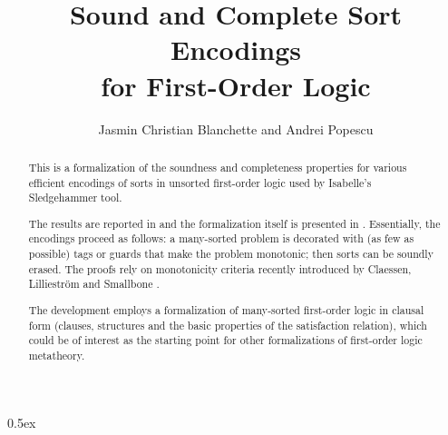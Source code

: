 \documentclass[11pt,a4paper]{article}
\begin{document}
\title{Sound and Complete Sort Encodings \\for First-Order Logic}
\author{Jasmin Christian Blanchette and Andrei Popescu}
\date{}
\maketitle

\begin{abstract}
This is a formalization of the soundness and completeness properties for
various efficient encodings of sorts in unsorted first-order logic
used by Isabelle's Sledgehammer tool.

The results are reported in
\cite[\S2,3]{blanchette-et-al-2013-types-conf} and the formalization itself
is presented in \cite[\S3--5]{froc}.
%
Essentially, the encodings proceed as follows: a many-sorted problem is
decorated with (as few as possible) tags or guards that make the problem monotonic;
then sorts can be soundly erased.
%
The proofs rely on monotonicity criteria recently introduced by
Claessen, Lilliestr{\"o}m and Smallbone \cite{claessen-et-al-2011}.


The development employs a formalization of many-sorted first-order logic in clausal
form (clauses, structures and the basic properties of the satisfaction relation), which could be
of interest as the starting point for other formalizations of first-order logic metatheory.
%
\end{abstract}




\newpage
\tableofcontents


\parindent 0pt\parskip 0.5ex





\end{document}
